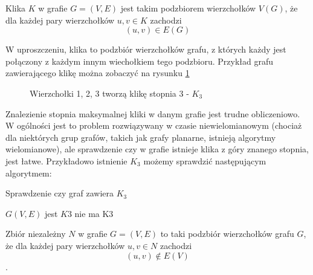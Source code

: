    \begin{definition}[Klika]
    Klika $K$ w grafie $G=(V,E)$ jest takim podzbiorem wierzchołków $V(G)$, że dla każdej pary wierzchołków $u, v \in K$ zachodzi $$(u, v) \in E(G)$$ 
   \end{definition}
   
   W uproszczeniu, klika to podzbiór wierzchołków grafu, z których każdy jest połączony z każdym innym wiechołkiem tego podzbioru. Przykład grafu zawierającego klikę można zobaczyć na rysunku \ref{klik}
   \begin{figure}[H]
   \centering
     \caption{Wierzchołki 1, 2, 3 tworzą klikę stopnia 3 - $K_3$ }
     \label{klik}
  \end{figure}

  Znalezienie stopnia maksymalnej kliki w danym grafie jest trudne obliczeniowo.
  W ogólności jest to problem rozwiązywany w czasie niewielomianowym (chociaż dla niektórych grup grafów, 
  takich jak grafy planarne, istnieją algorytmy wielomianowe), ale sprawdzenie czy w grafie istnieje klika
  z góry znanego stopnia, jest łatwe. Przykładowo istnienie $K_3$ możemy sprawdzić następującym algorytmem:
  
  \begin{algorithm}
    \caption{Sprawdzenie czy graf zawiera $K_3$}
    \begin{algorithmic}
    \REQUIRE $G(V, E) $
          \STATE \RETURN jest $K3$
        \ENDIF
      \ENDFOR
    \ENDFOR
    \STATE \RETURN nie ma K3
    \end{algorithmic}
  \end{algorithm}

  \begin{definition}
    Zbiór niezależny $N$ w grafie $G=(V,E)$ to taki podzbiór wierzchołków grafu $G$, że dla każdej pary wierzchołków $u, v \in N$ zachodzi $$(u, v) \notin E(V) $$. 
  \end{definition}

